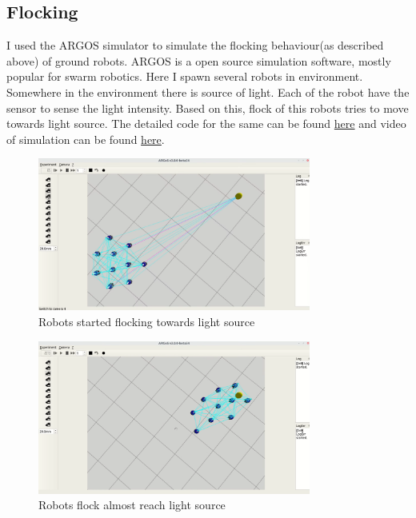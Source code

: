 \subsection{Flocking}
I used the ARGOS simulator to simulate the flocking behaviour(as described above) of ground robots. ARGOS is a open source simulation software, mostly popular for swarm robotics.\cite{argos} Here I spawn several robots in environment. Somewhere in the environment there is source of light. Each of the robot have the sensor to sense the light intensity. Based on this, flock of this robots tries to move towards light source. The detailed code for the same can be found \href{https://github.com/iamrajee/Slam_and_RL_BTP/tree/master/code/swarm/argos3-btp}{here}  and video of simulation can be found \href{https://youtu.be/y7pDO0bhHhA}{here}. 
\newline \begin{figure}[H]
    \centering
    \includegraphics[width=0.8\textwidth]{images/flocking1.png}
    \caption{Robots started flocking towards light source}
\end{figure}
\newline \begin{figure}[H]
    \centering
    \includegraphics[width=0.8\textwidth]{images/flocking3.png}
    \caption{Robots flock almost reach light source}
\end{figure}

